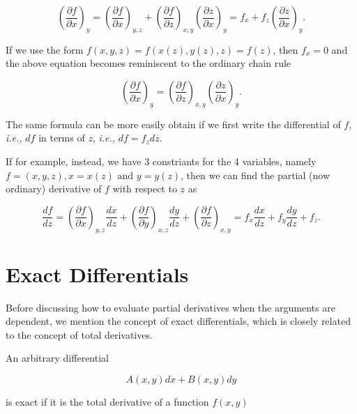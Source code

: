 \documentclass[english,a4paper,12pt]{report}
\begin{document}
\begin{equation}
	\left( \frac{\partial f}{\partial x} \right)_{y} = \left( \frac{\partial f}{\partial x} \right)_{y,z} + \left( \frac{\partial f}{\partial z} \right)_{x,y} \left( \frac{\partial z}{\partial x} \right)_{y} = f_{x} + f_{z} \left( \frac{\partial z}{\partial x} \right)_{y}. 
\end{equation}

If we use the form \(f(x,y,z) = f(x(z),y(z),z) = f(z)\), then \(f_{x} = 0 \) and the above equation becomes reminiscent to the ordinary chain rule

\begin{equation}
	\left( \frac{\partial f}{\partial x} \right)_{y} = \left( \frac{\partial f}{\partial z} \right)_{x,y} \left( \frac{\partial z}{\partial x} \right)_{y}. 
\end{equation}

The same formula can be more easily obtain if we first write the differential of \(f\), \textit{i.e.,} \(df\) in terms of \(z\), \textit{i.e.,} \(df = f_{z}dz \).  

If for example, instead, we have 3 constriants for the 4 variables, namely \(f = (x,y,z), x=x(z) \text { and } y=y(z)\), then we can find the partial (now ordinary) derivative of \(f\) with respect to \(z\) as

\begin{equation}
	\frac{df}{dz} = \left( \frac{\partial f}{\partial x} \right)_{y,z} \frac{dx}{dz} + \left( \frac{\partial f}{\partial y} \right)_{x,z} \frac{dy}{dz} + \left( \frac{\partial f}{\partial z} \right)_{x,y} = f_{x} \frac{dx}{dz} + f_{y} \frac{dy}{dz} + f_{z}.
\end{equation}



\section{Exact Differentials}

Before discussing how to evaluate partial derivatives when the arguments are dependent, we mention the concept of exact differentials, which is closely related to the concept of total derivatives.

An arbitrary differential 

\begin{equation}
    A(x,y) dx + B(x,y) dy
\end{equation}

is exact if it is the total derivative of a function \(f(x,y)\) 
\end{document}
